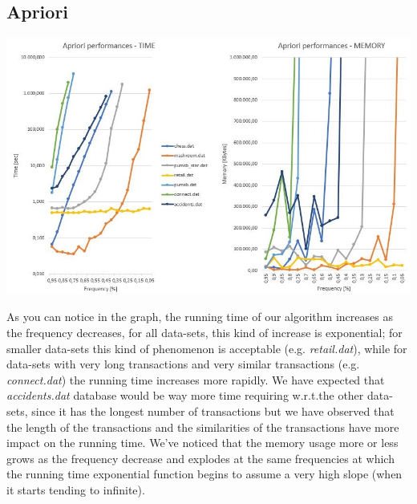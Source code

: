 \documentclass[11pt, a4paper]{article}
\begin{document}
		\subsection{Apriori}
			\includegraphics[scale =0.7]{Apriori.JPG}\par\vspace{1cm}
			As you can notice in the graph, the running time of our algorithm increases as the frequency decreases, for all data-sets, this kind of increase is exponential; for smaller data-sets this kind of phenomenon is acceptable (e.g. \textit{retail.dat}), while for data-sets with very long transactions and very similar transactions (e.g. \textit{connect.dat}) the running time increases more rapidly. \newline
			We have expected that \textit{accidents.dat} database would be way more time requiring w.r.t.the other data-sets, since it has the longest number of transactions but we have observed that the length of the transactions and the similarities of the transactions have more impact on the running time.
			We've noticed that the memory usage more or less grows as the frequency decrease and explodes at the same frequencies at which the running time exponential function begins to assume a very high slope (when it starts tending to infinite).
\end{document}
